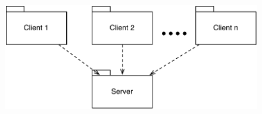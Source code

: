 \begin{figure}%
\includegraphics[scale=0.5]{input/architectural_design/client-server-architecture-pattern.pdf}%
\caption{}%
\label{}%
\end{figure}